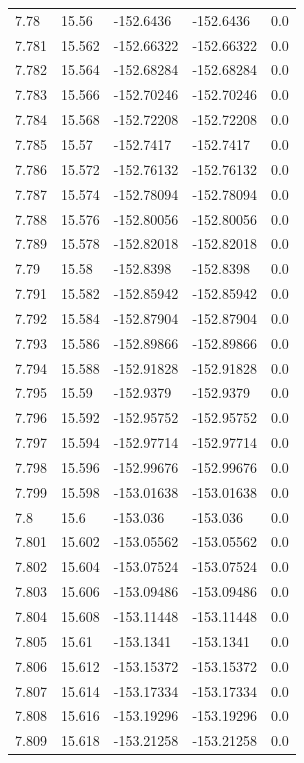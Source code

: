 \begin{tabular}{lllll}
7.78 & 15.56 & -152.6436 & -152.6436 & 0.0 \\
7.781 & 15.562 & -152.66322 & -152.66322 & 0.0 \\
7.782 & 15.564 & -152.68284 & -152.68284 & 0.0 \\
7.783 & 15.566 & -152.70246 & -152.70246 & 0.0 \\
7.784 & 15.568 & -152.72208 & -152.72208 & 0.0 \\
7.785 & 15.57 & -152.7417 & -152.7417 & 0.0 \\
7.786 & 15.572 & -152.76132 & -152.76132 & 0.0 \\
7.787 & 15.574 & -152.78094 & -152.78094 & 0.0 \\
7.788 & 15.576 & -152.80056 & -152.80056 & 0.0 \\
7.789 & 15.578 & -152.82018 & -152.82018 & 0.0 \\
7.79 & 15.58 & -152.8398 & -152.8398 & 0.0 \\
7.791 & 15.582 & -152.85942 & -152.85942 & 0.0 \\
7.792 & 15.584 & -152.87904 & -152.87904 & 0.0 \\
7.793 & 15.586 & -152.89866 & -152.89866 & 0.0 \\
7.794 & 15.588 & -152.91828 & -152.91828 & 0.0 \\
7.795 & 15.59 & -152.9379 & -152.9379 & 0.0 \\
7.796 & 15.592 & -152.95752 & -152.95752 & 0.0 \\
7.797 & 15.594 & -152.97714 & -152.97714 & 0.0 \\
7.798 & 15.596 & -152.99676 & -152.99676 & 0.0 \\
7.799 & 15.598 & -153.01638 & -153.01638 & 0.0 \\
7.8 & 15.6 & -153.036 & -153.036 & 0.0 \\
7.801 & 15.602 & -153.05562 & -153.05562 & 0.0 \\
7.802 & 15.604 & -153.07524 & -153.07524 & 0.0 \\
7.803 & 15.606 & -153.09486 & -153.09486 & 0.0 \\
7.804 & 15.608 & -153.11448 & -153.11448 & 0.0 \\
7.805 & 15.61 & -153.1341 & -153.1341 & 0.0 \\
7.806 & 15.612 & -153.15372 & -153.15372 & 0.0 \\
7.807 & 15.614 & -153.17334 & -153.17334 & 0.0 \\
7.808 & 15.616 & -153.19296 & -153.19296 & 0.0 \\
7.809 & 15.618 & -153.21258 & -153.21258 & 0.0 \\

\end{tabular}
